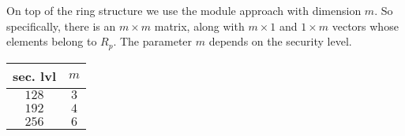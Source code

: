 On top of the ring structure we use the module approach with dimension $m$. So specifically, there is an $m \times m$ matrix, along with $m \times 1$ and $1 \times m$ vectors whose elements belong to $R_p$. The parameter $m$ depends on the security level.

\begin{center}
\begin{tabular}{c|c}
sec. lvl & $m$ \\ \hline
$128$ & $3$ \\
$192$ & $4$ \\
$256$ & $6$
\end{tabular}
\end{center}



